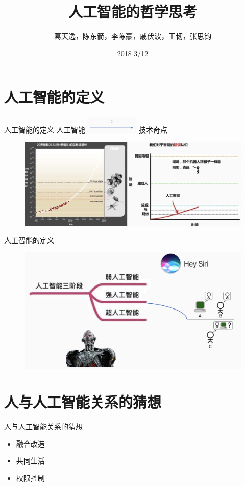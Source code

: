 \documentclass{beamer}
\title{人工智能的哲学思考}
\date{2018 3/12}
\author{葛天逸，陈东箭，李陈豪，戚伏波，王韧，张思钧}
\institute{马克思主义基本原理概论课堂讨论}
\begin{document}
  \maketitle
  \tableofcontents

  \section{人工智能的定义}
  \begin{frame}{人工智能的定义}
    人工智能    \includegraphics[width=1in]{qfbPic1} 技术奇点

   \begin{figure}[H]
   \centering
    \includegraphics[width=4.5in]{qfbPic2.jpg}
   \end{figure}

  \end{frame}

  \begin{frame}{人工智能的定义}
     \begin{figure}[H]
   \centering
    \includegraphics[width=4.5in]{qfbPic3.jpg}
   \end{figure}
  \end{frame}

  \section{人与人工智能关系的猜想}
  \begin{frame}{人与人工智能关系的猜想}
    \begin{itemize}
     \item 融合改造
     \item 共同生活
     \item 权限控制
    \end{itemize}
  \end{frame}
\end{document}
